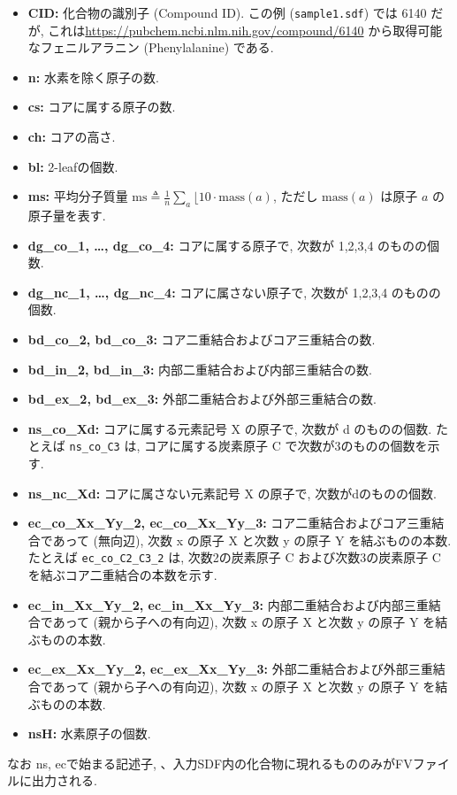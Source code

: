 \documentclass[11pt, titlepage, dvipdfmx, twoside]{jarticle}
\begin{document}
{\begin{itemize}
\item {\bf CID:} 化合物の識別子 (Compound ID).
  この例 ({\tt sample1.sdf}) では 6140 だが, これは\url{https://pubchem.ncbi.nlm.nih.gov/compound/6140} から取得可能なフェニルアラニン (Phenylalanine) である.
\item {\bf n:} 水素を除く原子の数.
\item {\bf cs:} コアに属する原子の数.
\item {\bf ch:} コアの高さ.
\item {\bf bl:} 2-leafの個数.
\item {\bf ms:} 平均分子質量 $\textrm{ms}\triangleq\frac{1}{n}\sum_{a}\lfloor 10 \cdot \textrm{mass}(a)$, ただし $\textrm{mass}(a)$ は原子 $a$ の原子量を表す.
\item {\bf dg\_co\_1, \dots, dg\_co\_4:} コアに属する原子で, 次数が 1,2,3,4 のものの個数.
\item {\bf dg\_nc\_1, \dots, dg\_nc\_4:} コアに属さない原子で, 次数が 1,2,3,4 のものの個数. 
\item {\bf bd\_co\_2, bd\_co\_3:} コア二重結合およびコア三重結合の数.
\item {\bf bd\_in\_2, bd\_in\_3:} 内部二重結合および内部三重結合の数.
\item {\bf bd\_ex\_2, bd\_ex\_3:} 外部二重結合および外部三重結合の数.
\item {\bf ns\_co\_Xd:} コアに属する元素記号 X の原子で,
  次数が d のものの個数.
  たとえば {\tt ns\_co\_C3} は, コアに属する炭素原子 C で次数が3のものの個数を示す.
\item {\bf ns\_nc\_Xd:} コアに属さない元素記号 X の原子で, 次数がdのものの個数.
\item {\bf ec\_co\_Xx\_Yy\_2, ec\_co\_Xx\_Yy\_3:}
  コア二重結合およびコア三重結合であって (無向辺),
  次数 x の原子 X と次数 y の原子 Y を結ぶものの本数.
  たとえば {\tt ec\_co\_C2\_C3\_2} は,
  次数2の炭素原子 C および次数3の炭素原子 C を結ぶコア二重結合の本数を示す.
\item {\bf ec\_in\_Xx\_Yy\_2, ec\_in\_Xx\_Yy\_3:}
  内部二重結合および内部三重結合であって (親から子への有向辺),
  次数 x の原子 X と次数 y の原子 Y を結ぶものの本数.
\item {\bf ec\_ex\_Xx\_Yy\_2, ec\_ex\_Xx\_Yy\_3:}
  外部二重結合および外部三重結合であって (親から子への有向辺),
  次数 x の原子 X と次数 y の原子 Y を結ぶものの本数.
\item {\bf nsH:} 水素原子の個数.
\end{itemize}

なお ns, ecで始まる記述子,
、入力SDF内の化合物に現れるもののみがFVファイルに出力される.
}
\end{document}
